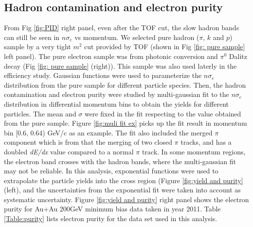 \subsection{Hadron contamination and electron purity}

From Fig \ref{fig:PID} right panel, even after the TOF cut, the slow
hadron bands can still be seen in $n\sigma_{e}$ vs momentum. We selected
pure hadron ($\pi$, $k$ and $p$) sample by a very tight $m^{2}$
cut provided by TOF (shown in Fig \ref{fig: pure sample} left panel).
The pure electron sample was from photonic conversion and $\pi^{0}$
Dalitz decay (Fig \ref{fig: pure sample} (right)). This sample was
also used laterly in the efficiency study. Gaussian functions were
used to parameterize the $n\sigma_{e}$ distribution from the pure
sample for different particle species. Then, the hadron contamination
and electron purity were studied by multi-gaussian fit to the $n\sigma_{e}$
distribution in differential momentum bins to obtain the yields for
different particles. The mean and $\sigma$ were fixed in the fit
respecting to the value obtained from the pure sample. Figure \ref{fig:muli fit ex}
picks up the fit result in momentum bin {[}0.6, 0.64) GeV/c as an
example. The fit also included the merged $\pi$ component which is
from that the merging of two closed $\pi$ tracks, and has a doubled
\emph{dE/dx} value compared to a normal $\pi$ track. In some momentum
regions, the electron band crosses with the hadron bands, where the
multi-gaussian fit may not be reliable. In this analysis, exponential
functions were used to extrapolate the particle yields into the cross
region (Figure \ref{fig:yield and purity} (left), and the uncertainties
from the exponential fit were taken into account as systematic uncertainty.
Figure \ref{fig:yield and purity} right panel shows the electron
purity for Au+Au 200GeV minimum bias data taken in year 2011. Table
\ref{Table:purity} lists electron purity for the data set used in
this analysis.

